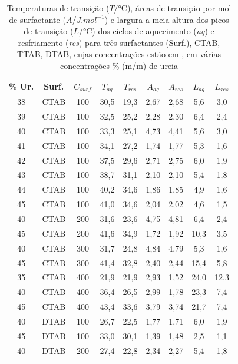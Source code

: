         \begin{table}
            \IBGEtab%
            {\caption{Temperaturas de transição ($T$/°C), áreas de transição por mol de surfactante ($A$/$J.mol^{-1}$) e largura a meia altura dos picos de transição ($L$/°C) dos ciclos de aquecimento (\emph{aq}) e resfriamento (\emph{res}) para três surfactantes (Surf.), CTAB, TTAB, DTAB, cujas concentrações estão em \mM, em várias concentrações \% (m/m) de ureia}
            \label{tab:DSC_temp_areas}}%
            {\begin{tabular}{ccccccccc}
                \toprule
    			\% Ur. & Surf. & $C_{surf}$ &
    			$T_{aq}$ & $T_{res}$ & $A_{aq}$ & $A_{res}$ & $L_{aq}$ & $L_{res}$\\
    			\midrule
    			38 & CTAB & 100 & 30,5 & 19,3 & 2,67 & 2,68 & 5,6 &	3,0\\
    			39 & CTAB & 100 & 32,5 & 25,2 & 2,28 & 2,30 & 6,4 &	2,4\\
    			40 & CTAB & 100 & 33,3 & 25,1 & 4,73 & 4,41 & 5,6 &	3,0\\
    			41 & CTAB & 100 & 34,1 & 27,2 & 1,74 & 1,77 & 5,3 &	1,6\\
    			42 & CTAB & 100 & 37,5 & 29,6 & 2,71 & 2,75 & 6,0 &	1,9\\
    			43 & CTAB & 100 & 38,7 & 31,1 & 2,10 & 2,10 & 5,4 &	1,8\\
    			44 & CTAB & 100 & 40,2 & 34,6 & 1,86 & 1,85 & 4,9 &	1,6\\
    			45 & CTAB & 100 & 41,0 & 34,6 & 2,04 & 2,02 & 4,6 &	1,5\\
    			40 & CTAB & 200 & 31,6 & 23,6 & 4,75 & 4,81 & 6,4 &	2,4\\
    			45 & CTAB & 200 & 41,6 & 34,9 & 1,72 & 1,92 & 10,3 & 3,5\\
    			40 & CTAB & 300 & 31,7 & 24,8 & 4,84 & 4,79 & 5,3 &	1,6\\
    			45 & CTAB & 300 & 41,4 & 32,8 & 2,40 & 2,44 & 15,4 & 5,8\\
    			35 & CTAB & 400 & 21,9 & 21,9 & 2,93 & 1,52 & 24,0 & 12,3\\
    			40 & CTAB & 400 & 36,4 & 26,5 & 2,99 & 1,78 & 23,3 & 7,4\\
    			45 & CTAB & 400 & 43,4 & 33,6 & 3,79 & 3,74 & 21,7 & 7,4\\
    			\midrule
    			40 & DTAB & 100 & 26,7 & 22,5 & 1,77 & 1,71 & 6,0 & 1,9\\
    			45 & DTAB & 100 & 33,0 & 30,1 & 1,39 & 1,48 & 2,5 & 1,1\\
    			40 & DTAB & 200 & 27,4 & 22,8 & 2,34 & 2,27 & 5,4 &	1,8\\

\end{tabular}}
\end{table}
